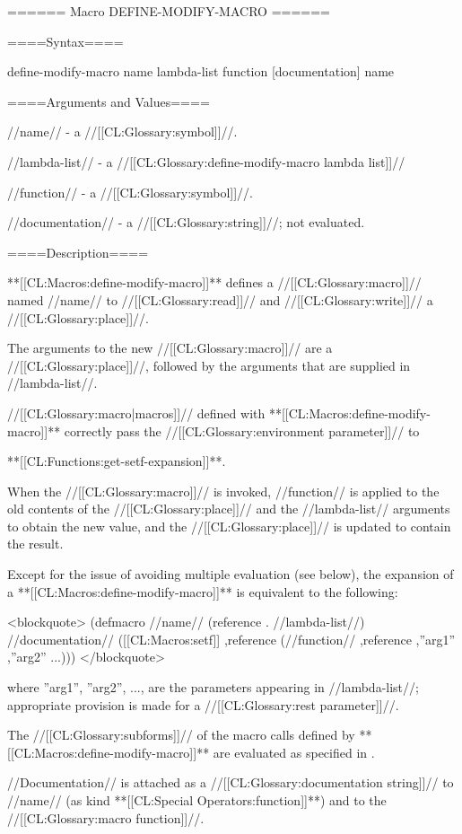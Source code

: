 ====== Macro DEFINE-MODIFY-MACRO ======

====Syntax====

\DefmacWithValues define-modify-macro {name lambda-list function [documentation]} {name}

====Arguments and Values====

//name// - a //[[CL:Glossary:symbol]]//.

//lambda-list// - a //[[CL:Glossary:define-modify-macro lambda list]]//

//function// - a //[[CL:Glossary:symbol]]//.

//documentation// - a //[[CL:Glossary:string]]//; not evaluated.

====Description====

**[[CL:Macros:define-modify-macro]]** defines a //[[CL:Glossary:macro]]// named //name// to //[[CL:Glossary:read]]// and //[[CL:Glossary:write]]// a //[[CL:Glossary:place]]//.

The arguments to the new //[[CL:Glossary:macro]]// are a //[[CL:Glossary:place]]//, followed by the arguments that are supplied in //lambda-list//.

//[[CL:Glossary:macro|macros]]// defined with **[[CL:Macros:define-modify-macro]]** correctly pass the //[[CL:Glossary:environment parameter]]// to

**[[CL:Functions:get-setf-expansion]]**.

When the //[[CL:Glossary:macro]]// is invoked, //function// is applied to the old contents of the //[[CL:Glossary:place]]// and the //lambda-list// arguments to obtain the new value, and the //[[CL:Glossary:place]]// is updated to contain the result.

Except for the issue of avoiding multiple evaluation (see below), the expansion of a **[[CL:Macros:define-modify-macro]]** is equivalent to the following:

<blockquote> (defmacro //name// (reference . //lambda-list//) //documentation// \bq([[CL:Macros:setf]] ,reference (//function// ,reference ,''arg1'' ,''arg2'' ...))) </blockquote>

where ''arg1'', ''arg2'', ..., are the parameters appearing in //lambda-list//; appropriate provision is made for a //[[CL:Glossary:rest parameter]]//.

The //[[CL:Glossary:subforms]]// of the macro calls defined by **[[CL:Macros:define-modify-macro]]** are evaluated as specified in \secref\GenRefSubFormEval.

//Documentation// is attached as a //[[CL:Glossary:documentation string]]// to //name// (as kind **[[CL:Special Operators:function]]**) and to the //[[CL:Glossary:macro function]]//.

